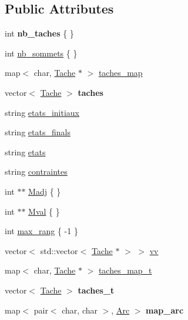 \subsection*{Public Attributes}
\begin{DoxyCompactItemize}
\item 
int {\bfseries nb\+\_\+taches} \{ \}\hypertarget{structGraphe__ordonnancement_a56005919cc51b83f976ac419ad9db598}{}\label{structGraphe__ordonnancement_a56005919cc51b83f976ac419ad9db598}

\item 
int \hyperlink{structGraphe__ordonnancement_a401dd0e1053f6d1c6673b8da7cebeca4}{nb\+\_\+sommets} \{ \}
\item 
map$<$ char, \hyperlink{structTache}{Tache} $\ast$ $>$ \hyperlink{structGraphe__ordonnancement_ae3827ffef7da6cfa9310c1329ba388ea}{taches\+\_\+map}
\item 
vector$<$ \hyperlink{structTache}{Tache} $>$ {\bfseries taches}\hypertarget{structGraphe__ordonnancement_a8bd4801b5540a85a3150c80f4db7d3e5}{}\label{structGraphe__ordonnancement_a8bd4801b5540a85a3150c80f4db7d3e5}

\item 
string \hyperlink{structGraphe__ordonnancement_afd7e0bf2bd8319f8b30467ee6759f3a0}{etats\+\_\+initiaux}
\item 
string \hyperlink{structGraphe__ordonnancement_a4329a36bd10f27bb0076557a1a8f3029}{etats\+\_\+finals}
\item 
string \hyperlink{structGraphe__ordonnancement_ab49a7a92f5595848655c34ee6cb71233}{etats}
\item 
string \hyperlink{structGraphe__ordonnancement_ad1424e58f4804d619a42098e7d0a5614}{contraintes}
\item 
int $\ast$$\ast$ \hyperlink{structGraphe__ordonnancement_a0088470c31eb4a734f8cbf3ef6906ad6}{Madj} \{ \}
\item 
int $\ast$$\ast$ \hyperlink{structGraphe__ordonnancement_afd38a144a1165aa9b03c71ef16c43e49}{Mval} \{ \}
\item 
int \hyperlink{structGraphe__ordonnancement_a6aa4fd24dfbccf0929b893cb93e7fb6b}{max\+\_\+rang} \{ -\/1 \}
\item 
vector$<$ std\+::vector$<$ \hyperlink{structTache}{Tache} $\ast$ $>$ $>$ \hyperlink{structGraphe__ordonnancement_a2e79a72fc442a1b9ea9734d40905d300}{vv}
\item 
map$<$ char, \hyperlink{structTache}{Tache} $\ast$ $>$ \hyperlink{structGraphe__ordonnancement_a194953cc290bf1c5c29ae162b988f422}{taches\+\_\+map\+\_\+t}
\item 
vector$<$ \hyperlink{structTache}{Tache} $>$ {\bfseries taches\+\_\+t}\hypertarget{structGraphe__ordonnancement_a63b206bacc1d913016748955cc74a193}{}\label{structGraphe__ordonnancement_a63b206bacc1d913016748955cc74a193}

\item 
map$<$ pair$<$ char, char $>$, \hyperlink{structArc}{Arc} $>$ {\bfseries map\+\_\+arc}\hypertarget{structGraphe__ordonnancement_affaa4d804d15276ffa6049e94b79984f}{}\label{structGraphe__ordonnancement_affaa4d804d15276ffa6049e94b79984f}

\end{DoxyCompactItemize}


